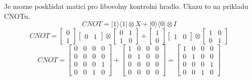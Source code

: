 \documentclass[12pt]{article}
\begin{document}
\par Je mozne poskládat matici pro libovolny kontrolni hradlo. Ukazu to na prikladu CNOTu.
$$CNOT = |1 \rangle\langle 1| \otimes X + |0 \rangle\langle 0| \otimes I$$
$$CNOT = \begin{bmatrix}
        0 \\
        1
    \end{bmatrix}\begin{bmatrix}
        0 & 1
    \end{bmatrix} \otimes \begin{bmatrix}
        0 & 1 \\
        1 & 0
    \end{bmatrix} + \begin{bmatrix}
        1 \\
        0
    \end{bmatrix}\begin{bmatrix}
        1 & 0
    \end{bmatrix} \otimes \begin{bmatrix}
        1 & 0 \\
        0 & 1
    \end{bmatrix}$$
$$CNOT = \begin{bmatrix}
        0 & 0 & 0 & 0 \\
        0 & 0 & 0 & 0 \\
        0 & 0 & 0 & 1 \\
        0 & 0 & 1 & 0
    \end{bmatrix} + \begin{bmatrix}
        1 & 0 & 0 & 0 \\
        0 & 1 & 0 & 0 \\
        0 & 0 & 0 & 0 \\
        0 & 0 & 0 & 0
    \end{bmatrix} = \begin{bmatrix}
        1 & 0 & 0 & 0 \\
        0 & 1 & 0 & 0 \\
        0 & 0 & 0 & 1 \\
        0 & 0 & 1 & 0
    \end{bmatrix}$$
\end{document}
